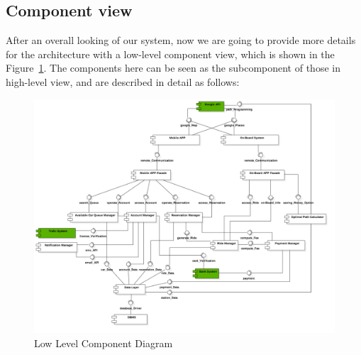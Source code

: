 \documentclass[a4paper,11pt]{article}
\begin{document}
	\subsection{Component view}
	After an overall looking of our system, now we are going to provide more details for the architecture with a low-level component view, which is shown in the Figure~\ref{fig-low}. The components here can be seen as the subcomponent of those in high-level view, and are described in detail as follows:
	 
		\begin{figure}[H]
   			\centering
   			\includegraphics[width=\textwidth]{images/low_level_CD}
  	    		\caption{Low Level Component Diagram}\label{fig-low}
		\end{figure}
\end{document}
